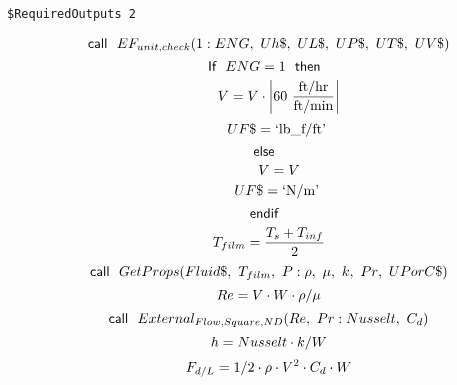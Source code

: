 \documentclass[10pt,fleqn]{article}
\newcommand{\F}[1]{\mbox{$#1$}}
\newcommand{\K}[1]{\mbox{\sf#1\ \ \mit}}
\newcommand{\KS}[1]{\mbox{\sf\ \ #1\ \ \mit}}
\newcommand{\SC}[1]{\mbox{`#1'}\  }
\newcommand{\V}[1]{\mbox{$ #1 $}}
\newcommand{\I}{\mbox{\hspace{0.20in}}}
\begin{document}
\begin{verbatim}
$RequiredOutputs 2
\end{verbatim}  \begin{equation}
\I \label{EES Eqn:327}
\K{call} \F{EF_{unit,check}}{ \left( 1:\V{ENG} ,\ Uh\$,\ UL\$,\ UP\$,\ UT\$,\ UV\$ \right) } 
\end{equation}
\begin{equation}
\I \label{EES Eqn:328}
\K{If} \V{ENG} =1 \KS{then} 
\end{equation}
\begin{equation}
\I \I \label{EES Eqn:329}
V=V\cdot \rm { \left|60\ \frac {\rm{ft/hr}}{\rm{ft/min}}\right|} 
\end{equation}
\begin{equation}
\I \I \label{EES Eqn:330}
UF\$=\SC{lb\_f/ft} 
\end{equation}
\begin{equation}
\I \label{EES Eqn:331}
\K{else} 
\end{equation}
\begin{equation}
\I \I \label{EES Eqn:332}
V=V 
\end{equation}
\begin{equation}
\I \I \label{EES Eqn:333}
UF\$=\SC{N/m} 
\end{equation}
\begin{equation}
\I \label{EES Eqn:334}
\K{endif} 
\end{equation}
\begin{equation}
\I \label{EES Eqn:335}
T_{film}=\frac {T_{s}+T_{inf}}{ 2 } 
\end{equation}
\begin{equation}
\I \label{EES Eqn:336}
\K{call} \F{GetProps}{ \left( Fluid\$,\ T_{film},\ P: \rho,\ \mu,\ k,\ \V{Pr} ,\ UPorC\$ \right) } 
\end{equation}
\begin{equation}
\I \label{EES Eqn:337}
\V{Re} =V\cdot W\cdot \rho/\mu 
\end{equation}
\begin{equation}
\I \label{EES Eqn:338}
\K{call} \F{External_{Flow,Square,ND}}{ \left( \V{Re} ,\ \V{Pr} :\V{Nusselt} ,\ C_{d} \right) } 
\end{equation}
\begin{equation}
\I \label{EES Eqn:339}
h=\V{Nusselt} \cdot k/W 
\end{equation}
\begin{equation}
\I \label{EES Eqn:340}
F_{d/L}=1/2\cdot \rho\cdot V^{2}\cdot C_{d}\cdot W 
\end{equation}
\end{document}
